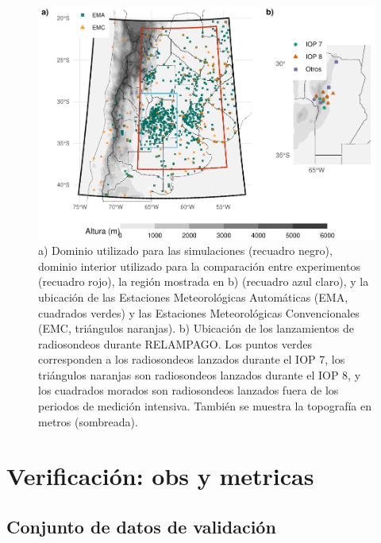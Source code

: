 \documentclass[12pt,twoside]{reedthesis}
\begin{document}
\begin{figure}

{\centering \includegraphics[width=0.8\linewidth]{thesis_files/figure-latex/dominio-1} 

}

\caption{a) Dominio utilizado para las simulaciones (recuadro negro), dominio interior utilizado para la comparación entre experimentos (recuadro rojo), la región mostrada en b) (recuadro azul claro), y la ubicación de las Estaciones Meteorológicas Automáticas (EMA, cuadrados verdes) y las Estaciones Meteorológicas Convencionales (EMC, triángulos naranjas). b) Ubicación de los lanzamientos de radiosondeos durante RELAMPAGO. Los puntos verdes corresponden a los radiosondeos lanzados durante el IOP 7, los triángulos naranjas son radiosondeos lanzados durante el IOP 8, y los cuadrados morados son radiosondeos lanzados fuera de los periodos de medición intensiva. También se muestra la topografía en metros (sombreada).}\label{fig:dominio}
\end{figure}
\hypertarget{verificaciuxf3n-obs-y-metricas}{%
\section{Verificación: obs y metricas}\label{verificaciuxf3n-obs-y-metricas}}

\hypertarget{conjunto-de-datos-de-validaciuxf3n}{%
\subsection{Conjunto de datos de validación}\label{conjunto-de-datos-de-validaciuxf3n}}
\end{document}

